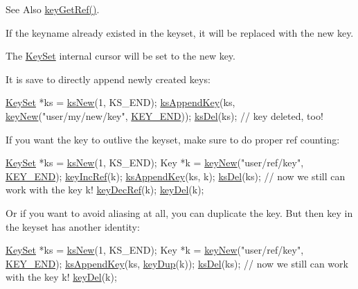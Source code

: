 \begin{DoxySeeAlso}{See Also}
\hyperlink{group__key_ga4aabc4272506dd63161db2bbb42de8ae}{key\-Get\-Ref()}.
\end{DoxySeeAlso}
If the keyname already existed in the keyset, it will be replaced with the new key.

The \hyperlink{classkdb_1_1KeySet}{Key\-Set} internal cursor will be set to the new key.

It is save to directly append newly created keys\-: 
\begin{DoxyCodeInclude}
\hyperlink{classkdb_1_1KeySet_a4eac9850fa4f06c07a5306befc3e4377}{KeySet} *ks = \hyperlink{group__keyset_ga671e1aaee3ae9dc13b4834a4ddbd2c3c}{ksNew}(1, KS\_END);
\hyperlink{group__keyset_gaa5a1d467a4d71041edce68ea7748ce45}{ksAppendKey}(ks,
        \hyperlink{group__key_gad23c65b44bf48d773759e1f9a4d43b89}{keyNew}(\textcolor{stringliteral}{"user/my/new/key"}, \hyperlink{group__key_gga91fb3178848bd682000958089abbaf40aa8adb6fcb92dec58fb19410eacfdd403}{KEY\_END}));
\hyperlink{group__keyset_ga27e5c16473b02a422238c8d970db7ac8}{ksDel}(ks);
\textcolor{comment}{// key deleted, too!}
\end{DoxyCodeInclude}
 If you want the key to outlive the keyset, make sure to do proper ref counting\-: 
\begin{DoxyCodeInclude}
\hyperlink{classkdb_1_1KeySet_a4eac9850fa4f06c07a5306befc3e4377}{KeySet} *ks = \hyperlink{group__keyset_ga671e1aaee3ae9dc13b4834a4ddbd2c3c}{ksNew}(1, KS\_END);
Key *k = \hyperlink{group__key_gad23c65b44bf48d773759e1f9a4d43b89}{keyNew}(\textcolor{stringliteral}{"user/ref/key"}, \hyperlink{group__key_gga91fb3178848bd682000958089abbaf40aa8adb6fcb92dec58fb19410eacfdd403}{KEY\_END});
\hyperlink{group__key_ga6970a6f254d67af7e39f8e469bb162f1}{keyIncRef}(k);
\hyperlink{group__keyset_gaa5a1d467a4d71041edce68ea7748ce45}{ksAppendKey}(ks, k);
\hyperlink{group__keyset_ga27e5c16473b02a422238c8d970db7ac8}{ksDel}(ks);
\textcolor{comment}{// now we still can work with the key k!}
\hyperlink{group__key_ga2c6433ca22109e4e141946057eccb283}{keyDecRef}(k);
\hyperlink{group__key_ga3df95bbc2494e3e6703ece5639be5bb1}{keyDel}(k);
\end{DoxyCodeInclude}
 Or if you want to avoid aliasing at all, you can duplicate the key. But then key in the keyset has another identity\-: 
\begin{DoxyCodeInclude}
\hyperlink{classkdb_1_1KeySet_a4eac9850fa4f06c07a5306befc3e4377}{KeySet} *ks = \hyperlink{group__keyset_ga671e1aaee3ae9dc13b4834a4ddbd2c3c}{ksNew}(1, KS\_END);
Key *k = \hyperlink{group__key_gad23c65b44bf48d773759e1f9a4d43b89}{keyNew}(\textcolor{stringliteral}{"user/ref/key"}, \hyperlink{group__key_gga91fb3178848bd682000958089abbaf40aa8adb6fcb92dec58fb19410eacfdd403}{KEY\_END});
\hyperlink{group__keyset_gaa5a1d467a4d71041edce68ea7748ce45}{ksAppendKey}(ks, \hyperlink{group__key_gae6ec6a60cc4b8c1463fa08623d056ce3}{keyDup}(k));
\hyperlink{group__keyset_ga27e5c16473b02a422238c8d970db7ac8}{ksDel}(ks);
\textcolor{comment}{// now we still can work with the key k!}
\hyperlink{group__key_ga3df95bbc2494e3e6703ece5639be5bb1}{keyDel}(k);
\end{DoxyCodeInclude}
